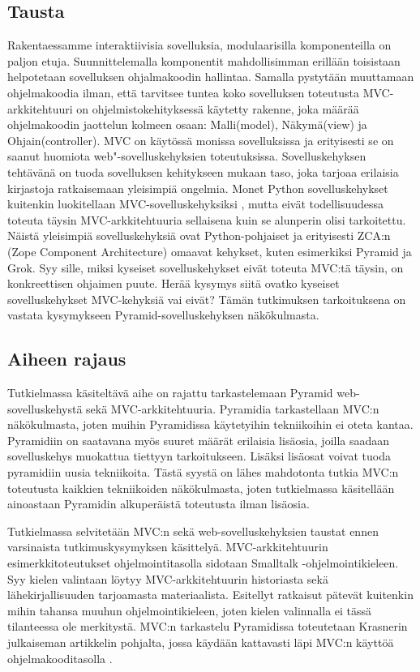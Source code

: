 \documentclass[finnish,utf8,nonumbib,palatino,kandi]{gradu2}
\begin{document}
\subsection{Tausta}
Rakentaessamme interaktiivisia sovelluksia, modulaarisilla komponenteilla on paljon etuja. Suunnittelemalla komponentit mahdollisimman erillään toisistaan helpotetaan
sovelluksen ohjalmakoodin hallintaa. Samalla pystytään muuttamaan ohjelmakoodia ilman, että tarvitsee tuntea koko sovelluksen toteutusta \cite[s.2]{Krasner:desc}
MVC-arkkitehtuuri on ohjelmistokehityksessä käytetty rakenne, joka määrää ohjelmakoodin jaottelun kolmeen osaan: Malli(model), Näkymä(view) ja Ohjain(controller). MVC on käytössä monissa sovelluksissa ja erityisesti se on saanut
huomiota web"-sovelluskehyksien toteutuksissa. Sovelluskehyksen tehtävänä on tuoda sovelluksen kehitykseen mukaan
taso, joka tarjoaa erilaisia kirjastoja ratkaisemaan yleisimpiä ongelmia. Monet Python sovelluskehykset kuitenkin luokitellaan MVC-sovelluskehyksiksi \cite{mvcframeworks}, mutta eivät
todellisuudessa toteuta täysin MVC-arkkitehtuuria sellaisena kuin se alunperin olisi tarkoitettu. Näistä yleisimpiä sovelluskehyksiä ovat Python-pohjaiset
ja erityisesti ZCA:n (Zope Component Architecture) omaavat kehykset, kuten esimerkiksi Pyramid ja Grok. Syy sille, miksi
kyseiset sovelluskehykset eivät toteuta MVC:tä täysin, on konkreettisen ohjaimen puute.
Herää kysymys siitä ovatko kyseiset sovelluskehykset MVC-kehyksiä vai eivät? Tämän tutkimuksen tarkoituksena on vastata kysymykseen Pyramid-sovelluskehyksen näkökulmasta.

\subsection{Aiheen rajaus}
Tutkielmassa käsiteltävä aihe on rajattu tarkastelemaan Pyramid web-sovelluskehystä sekä MVC-arkkitehtuuria. Pyramidia
tarkastellaan MVC:n näkökulmasta, joten muihin Pyramidissa käytetyihin tekniikoihin ei oteta kantaa. Pyramidiin on saatavana myös suuret määrät erilaisia lisäosia,
joilla saadaan sovelluskehys muokattua tiettyyn tarkoitukseen.
Lisäksi lisäosat voivat tuoda pyramidiin uusia tekniikoita. Tästä syystä on lähes mahdotonta tutkia MVC:n toteutusta kaikkien tekniikoiden näkökulmasta,
joten tutkielmassa käsitellään ainoastaan Pyramidin alkuperäistä toteutusta ilman lisäosia.

Tutkielmassa selvitetään MVC:n sekä web-sovelluskehyksien taustat ennen varsinaista tutkimuskysymyksen käsittelyä. MVC-arkkitehtuurin esimerkkitoteutukset ohjelmointitasolla sidotaan Smalltalk -ohjelmointikieleen.
Syy kielen valintaan löytyy MVC-arkkitehtuurin historiasta sekä lähekirjallisuuden tarjoamasta materiaalista. Esitellyt ratkaisut
pätevät kuitenkin mihin tahansa muuhun ohjelmointikieleen, joten kielen valinnalla ei tässä tilanteessa ole merkitystä.
 MVC:n tarkastelu Pyramidissa toteutetaan Krasnerin julkaiseman artikkelin pohjalta, jossa käydään kattavasti läpi MVC:n käyttöä ohjelmakooditasolla \cite{Krasner:desc}.  \\
\end{document}
